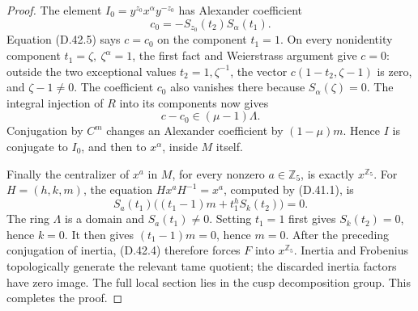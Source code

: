 \begin{proof}
The element \(I_0=y^{z_0}x^\alpha y^{-z_0}\)
has Alexander coefficient
\[
                   c_0=-S_{z_0}(t_2)S_\alpha(t_1).
\]
Equation (D.42.5) says \(c=c_0\) on the
component \(t_1=1\). On every nonidentity
component \(t_1=\zeta,\ \zeta^\alpha=1\),
the first fact and Weierstrass argument
give \(c=0\): outside the two exceptional
values \(t_2=1,\zeta^{-1}\), the vector
\(c(1-t_2,\zeta-1)\) is zero, and
\(\zeta-1\ne0\). The coefficient \(c_0\)
also vanishes there because \(S_\alpha(\zeta)=0\).
The integral injection of \(R\) into its
components now gives
\[
                          c-c_0\in(\mu-1)\Lambda.
\]
Conjugation by \(C^m\) changes an Alexander
coefficient by \((1-\mu)m\). Hence \(I\)
is conjugate to \(I_0\), and then to
\(x^\alpha\), inside \(M\) itself.

Finally the centralizer of \(x^a\) in
\(M\), for every nonzero \(a\in\mathbb Z_5\),
is exactly \(x^{\mathbb Z_5}\).
For \(H=(h,k,m)\), the equation
\(Hx^aH^{-1}=x^a\), computed by (D.41.1),
is
\[
 S_a(t_1)\bigl((t_1-1)m+t_1^hS_k(t_2)\bigr)=0.
\]
The ring \(\Lambda\) is a domain and
\(S_a(t_1)\ne0\). Setting \(t_1=1\)
first gives \(S_k(t_2)=0\), hence \(k=0\).
It then gives \((t_1-1)m=0\), hence \(m=0\).
After the preceding conjugation of inertia,
(D.42.4) therefore forces \(F\) into
\(x^{\mathbb Z_5}\). Inertia and Frobenius
topologically generate the relevant tame
quotient; the discarded inertia factors
have zero image. The full local section
lies in the cusp decomposition group.
This completes the proof.
\end{proof}

